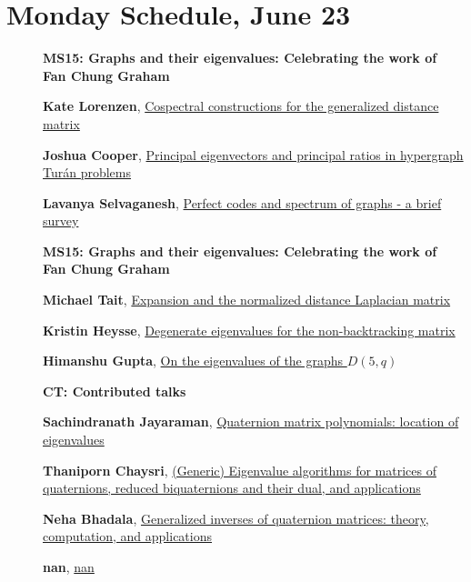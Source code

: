\documentclass[ILAS2025-program.tex]{subfiles}
\begin{document}
\section*{Monday Schedule, June 23 }
        
        \begin{description}
    \item[] {\color{mstitle}\textbf{MS15: Graphs and their eigenvalues: Celebrating the work of Fan Chung Graham}} 
    \item[] \hypertarget{up0028}{}\textbf{Kate Lorenzen}, \hyperlink{down0028}{Cospectral constructions for the generalized distance matrix}
        \item[] \hypertarget{up0029}{}\textbf{Joshua Cooper}, \hyperlink{down0029}{Principal eigenvectors and principal ratios in hypergraph Tur\'{a}n problems}
        \item[] \hypertarget{up0030}{}\textbf{Lavanya Selvaganesh}, \hyperlink{down0030}{Perfect codes and spectrum of graphs - a brief survey
}
        \end{description}
    \begin{description}
    \item[] {\color{mstitle}\textbf{MS15: Graphs and their eigenvalues: Celebrating the work of Fan Chung Graham}} 
    \item[] \hypertarget{up0061}{}\textbf{Michael Tait}, \hyperlink{down0061}{Expansion and the normalized distance Laplacian matrix}
        \item[] \hypertarget{up0062}{}\textbf{Kristin Heysse}, \hyperlink{down0062}{Degenerate eigenvalues for the non-backtracking matrix}
        \item[] \hypertarget{up0063}{}\textbf{Himanshu Gupta}, \hyperlink{down0063}{On the eigenvalues of the graphs $D(5, q)$}
        \end{description}
    \begin{description}
    \item[] {\color{mstitle}\textbf{CT: Contributed talks}} 
    \item[] \hypertarget{up0100}{}\textbf{Sachindranath Jayaraman}, \hyperlink{down0100}{Quaternion matrix polynomials: location of eigenvalues}
        \item[] \hypertarget{up0101}{}\textbf{Thaniporn Chaysri}, \hyperlink{down0101}{(Generic) Eigenvalue algorithms for matrices of quaternions, reduced biquaternions and their dual, and applications}
        \item[] \hypertarget{up0102}{}\textbf{Neha Bhadala}, \hyperlink{down0102}{Generalized inverses of quaternion matrices: theory, computation, and applications}
        \item[] \hypertarget{up0103}{}\textbf{nan}, \hyperlink{down0103}{nan}
        \end{description}
    \newpage
\end{document}

